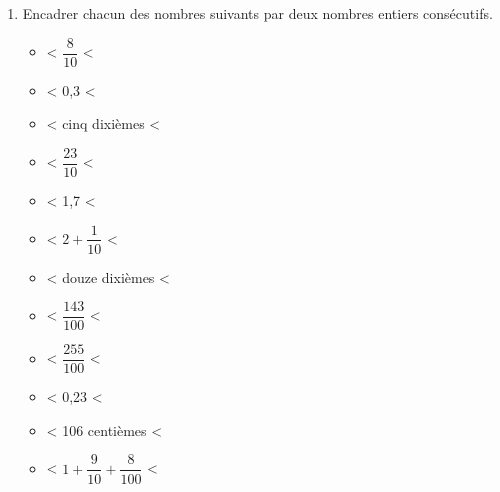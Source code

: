 \begin{activite}
\begin{enumerate}
             \item Encadrer chacun des nombres suivants par deux nombres entiers consécutifs.
             \begin{spacing}{1.6}
                \begin{multicols}{2}
                    \begin{itemize}
                        \item \makebox[0.2\linewidth]{\dotfill} < $\dfrac{8}{10}$ <                     \makebox[0.2\linewidth]{\dotfill}
                        \item \makebox[0.2\linewidth]{\dotfill} < 0,3 <                                 \makebox[0.2\linewidth]{\dotfill}
                        \item \makebox[0.2\linewidth]{\dotfill} < {\small cinq dixièmes} <              \makebox[0.2\linewidth]{\dotfill}
                        \item \makebox[0.2\linewidth]{\dotfill} < $\dfrac{23}{10}$ <                    \makebox[0.2\linewidth]{\dotfill}
                        \item \makebox[0.2\linewidth]{\dotfill} < 1,7 <                                 \makebox[0.2\linewidth]{\dotfill}
                        \item \makebox[0.2\linewidth]{\dotfill} < $2+\dfrac{1}{10}$ <                   \makebox[0.2\linewidth]{\dotfill}
                        \columnbreak
                        \item \makebox[0.2\linewidth]{\dotfill} < {\small douze dixièmes} <             \makebox[0.2\linewidth]{\dotfill}
                        \item \makebox[0.2\linewidth]{\dotfill} < $\dfrac{143}{100}$ <                  \makebox[0.2\linewidth]{\dotfill}
                        \item \makebox[0.2\linewidth]{\dotfill} < $\dfrac{255}{100}$ <                  \makebox[0.2\linewidth]{\dotfill}
                        \item \makebox[0.2\linewidth]{\dotfill} < 0,23 <                                \makebox[0.2\linewidth]{\dotfill}
                        \item \makebox[0.2\linewidth]{\dotfill} < {\small 106 centièmes} <              \makebox[0.2\linewidth]{\dotfill}
                        \item \makebox[0.2\linewidth]{\dotfill} < $1+\dfrac{9}{10}+\dfrac{8}{100}$ <    \makebox[0.2\linewidth]{\dotfill}
                    \end{itemize}

\end{multicols}
\end{spacing}
\end{enumerate}
\end{activite}
